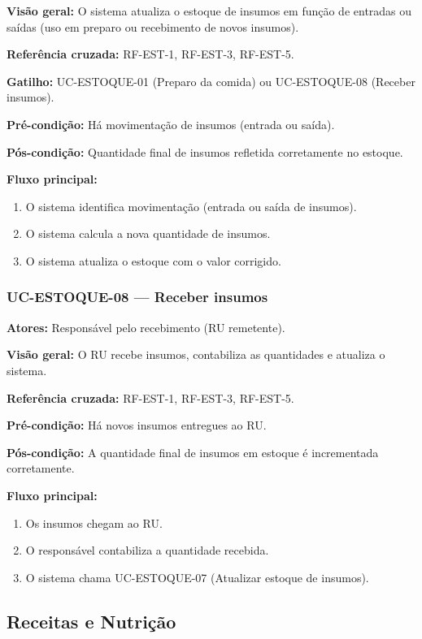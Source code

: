 \documentclass[12pt,a4paper]{article}
\begin{document}
\textbf{Visão geral:} O sistema atualiza o estoque de insumos em função de entradas ou saídas (uso em preparo ou recebimento de novos insumos).  

\textbf{Referência cruzada:} RF-EST-1, RF-EST-3, RF-EST-5.  

\textbf{Gatilho:} UC-ESTOQUE-01 (Preparo da comida) ou UC-ESTOQUE-08 (Receber insumos).  

\textbf{Pré-condição:} Há movimentação de insumos (entrada ou saída).  

\textbf{Pós-condição:} Quantidade final de insumos refletida corretamente no estoque.  

\textbf{Fluxo principal:}
\begin{enumerate}
    \item O sistema identifica movimentação (entrada ou saída de insumos).
    \item O sistema calcula a nova quantidade de insumos.
    \item O sistema atualiza o estoque com o valor corrigido.
\end{enumerate}

\subsubsection{UC-ESTOQUE-08 — Receber insumos}
\textbf{Atores:} Responsável pelo recebimento (RU remetente).  

\textbf{Visão geral:} O RU recebe insumos, contabiliza as quantidades e atualiza o sistema.  

\textbf{Referência cruzada:} RF-EST-1, RF-EST-3, RF-EST-5.  

\textbf{Pré-condição:} Há novos insumos entregues ao RU.  

\textbf{Pós-condição:} A quantidade final de insumos em estoque é incrementada corretamente.  

\textbf{Fluxo principal:}
\begin{enumerate}
    \item Os insumos chegam ao RU.
    \item O responsável contabiliza a quantidade recebida.
    \item O sistema chama UC-ESTOQUE-07 (Atualizar estoque de insumos).
\end{enumerate}

\subsection{Receitas e Nutrição}
\end{document}
